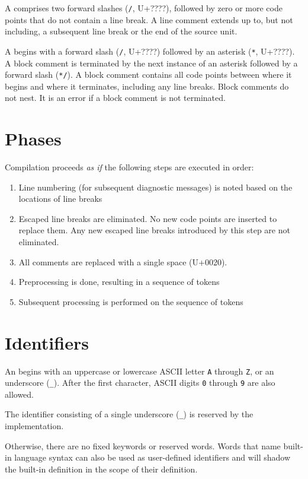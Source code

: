 A  comprises two forward slashes (\lstinline{/}, U+????), followed by zero or more code points that do not contain a line break. A line comment extends up to, but not including, a subsequent line break or the end of the source unit.

A  begins with a forward slash (\lstinline{/}, U+????) followed by an asterisk (\lstinline|*|, U+????). A block comment is terminated by the next instance of an asterisk followed by a forward slash (\lstinline|*/|).
A block comment contains all code points between where it begins and where it terminates, including any line breaks.
Block comments do not nest.
It is an error if a block comment is not terminated.

\section{Phases}

Compilation proceeds \emph{as if} the following steps are executed in order:

\begin{enumerate}
	\item Line numbering (for subsequent diagnostic messages) is noted based on the locations of line breaks
	\item Escaped line breaks are eliminated. No new code points are inserted to replace them. Any new escaped line breaks introduced by this step are not eliminated.
	\item All comments are replaced with a single space (U+0020).
	\item Preprocessing is done, resulting in a sequence of tokens
	\item Subsequent processing is performed on the sequence of tokens
\end{enumerate}

\section{Identifiers}

An  begins with an uppercase or lowercase ASCII letter \lstinline|A| through \lstinline|Z|, or an underscore (\lstinline|_|).
After the first character, ASCII digits \lstinline|0| through \lstinline|9| are also allowed.

The identifier consisting of a single underscore (\lstinline|_|) is reserved by the implementation.

Otherwise, there are no fixed keywords or reserved words.
Words that name built-in language syntax can also be used as user-defined identifiers and will shadow the built-in definition in the scope of their definition.

